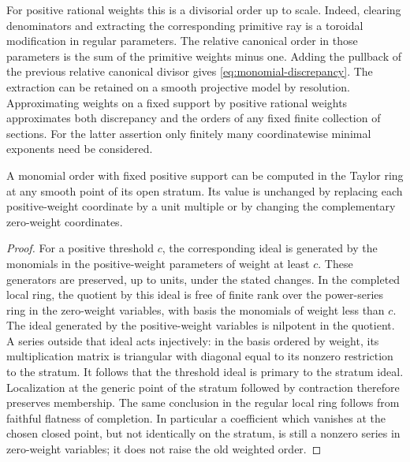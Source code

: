 For positive rational weights this is a divisorial order up to scale. Indeed, clearing denominators and extracting the corresponding primitive ray is a toroidal modification in regular parameters. The relative canonical order in those parameters is the sum of the primitive weights minus one. Adding the pullback of the previous relative canonical divisor gives \eqref{eq:monomial-discrepancy}. The extraction can be retained on a smooth projective model by resolution. Approximating weights on a fixed support by positive rational weights approximates both discrepancy and the orders of any fixed finite collection of sections. For the latter assertion only finitely many coordinatewise minimal exponents need be considered.

\begin{lemma}\label{lem:monomial-local}
A monomial order with fixed positive support can be computed in the Taylor ring at any smooth point of its open stratum. Its value is unchanged by replacing each positive-weight coordinate by a unit multiple or by changing the complementary zero-weight coordinates.
\end{lemma}
\begin{proof}
For a positive threshold $c$, the corresponding ideal is generated by the monomials in the positive-weight parameters of weight at least $c$. These generators are preserved, up to units, under the stated changes. In the completed local ring, the quotient by this ideal is free of finite rank over the power-series ring in the zero-weight variables, with basis the monomials of weight less than $c$. The ideal generated by the positive-weight variables is nilpotent in the quotient. A series outside that ideal acts injectively: in the basis ordered by weight, its multiplication matrix is triangular with diagonal equal to its nonzero restriction to the stratum. It follows that the threshold ideal is primary to the stratum ideal. Localization at the generic point of the stratum followed by contraction therefore preserves membership. The same conclusion in the regular local ring follows from faithful flatness of completion. In particular a coefficient which vanishes at the chosen closed point, but not identically on the stratum, is still a nonzero series in zero-weight variables; it does not raise the old weighted order.
\end{proof}

